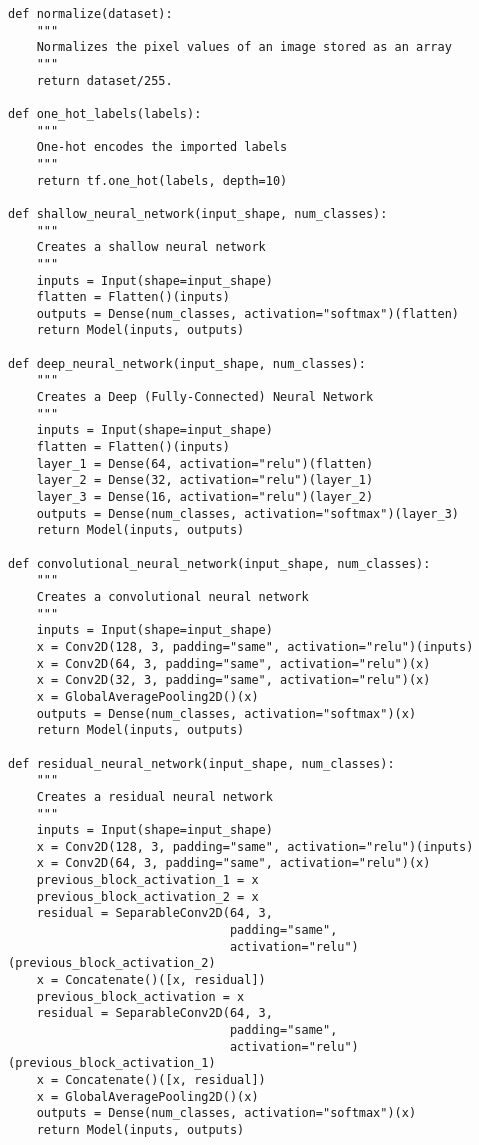 \documentclass{article} %
\begin{document}
\lstset{language=Python}
\lstset{frame=lines}
\lstset{basicstyle=\footnotesize}
\begin{lstlisting}
def normalize(dataset):
    """
    Normalizes the pixel values of an image stored as an array
    """
    return dataset/255.

def one_hot_labels(labels):
    """
    One-hot encodes the imported labels
    """
    return tf.one_hot(labels, depth=10)
    
def shallow_neural_network(input_shape, num_classes):
    """
    Creates a shallow neural network
    """
    inputs = Input(shape=input_shape)
    flatten = Flatten()(inputs)
    outputs = Dense(num_classes, activation="softmax")(flatten)
    return Model(inputs, outputs)
    
def deep_neural_network(input_shape, num_classes):
    """
    Creates a Deep (Fully-Connected) Neural Network
    """
    inputs = Input(shape=input_shape)
    flatten = Flatten()(inputs)
    layer_1 = Dense(64, activation="relu")(flatten)
    layer_2 = Dense(32, activation="relu")(layer_1)
    layer_3 = Dense(16, activation="relu")(layer_2)
    outputs = Dense(num_classes, activation="softmax")(layer_3)
    return Model(inputs, outputs)

def convolutional_neural_network(input_shape, num_classes):
    """
    Creates a convolutional neural network
    """
    inputs = Input(shape=input_shape)
    x = Conv2D(128, 3, padding="same", activation="relu")(inputs)
    x = Conv2D(64, 3, padding="same", activation="relu")(x)
    x = Conv2D(32, 3, padding="same", activation="relu")(x)
    x = GlobalAveragePooling2D()(x)
    outputs = Dense(num_classes, activation="softmax")(x)
    return Model(inputs, outputs)
    
def residual_neural_network(input_shape, num_classes):
    """
    Creates a residual neural network
    """
    inputs = Input(shape=input_shape)
    x = Conv2D(128, 3, padding="same", activation="relu")(inputs)
    x = Conv2D(64, 3, padding="same", activation="relu")(x)
    previous_block_activation_1 = x
    previous_block_activation_2 = x
    residual = SeparableConv2D(64, 3, 
                               padding="same", 
                               activation="relu")(previous_block_activation_2)
    x = Concatenate()([x, residual])
    previous_block_activation = x
    residual = SeparableConv2D(64, 3, 
                               padding="same", 
                               activation="relu")(previous_block_activation_1)
    x = Concatenate()([x, residual])
    x = GlobalAveragePooling2D()(x)
    outputs = Dense(num_classes, activation="softmax")(x)
    return Model(inputs, outputs)


\end{lstlisting}
\end{document}
